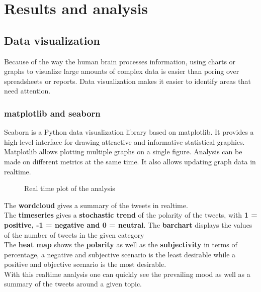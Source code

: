 \chapter{Results and analysis}\label{ch:Results}
\section{Data visualization}
Because of the way the human brain processes information, using charts or graphs to visualize large amounts of complex data is easier than poring over spreadsheets or reports. 
Data visualization makes it easier to identify areas that need attention.

\subsection{matplotlib and seaborn}
Seaborn is a Python data visualization library based on matplotlib. It provides a high-level interface for drawing attractive and informative statistical graphics.
Matplotlib allows plotting multiple graphs on a single figure. Analysis can be made on different metrics at the same time. It also allows updating graph data in realtime.
\clearpage
\begin{figure}[h]
  \centering
  \caption[Real time plot of the analysis]
  {Real time plot of the analysis}
  \label{fig:ALAP:sm1}
\end{figure}


The \textbf{wordcloud} gives a summary of the tweets in realtime.\\
The \textbf{timeseries} gives a \textbf{stochastic trend} of the polarity of the tweets, with \textbf{1 = positive, -1 = negative and 0 = neutral}.
The \textbf{barchart} displays the values of the number of tweets in the given category\\
The \textbf{heat map} shows the \textbf{polarity} as well as the \textbf{subjectivity} in terms of percentage,
a negative and subjective scenario is the least desirable while a positive and objective scenario is the most desirable.\\

With this realtime analysis one can quickly see the prevailing mood as well as a summary of the tweets around a given topic.

